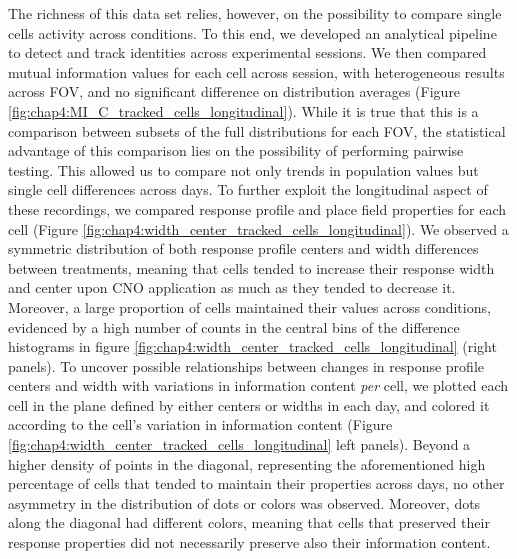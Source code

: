 The richness of this data set relies, however, on the possibility to compare single cells activity across conditions. 
To this end, we developed an analytical pipeline to detect and track identities across experimental sessions.  
We then compared mutual information values for each cell across session, with heterogeneous results across FOV, and no significant difference on distribution averages (Figure \ref{fig:chap4:MI_C_tracked_cells_longitudinal}). 
While it is true that this is a comparison between subsets of the full distributions for each FOV, the statistical advantage of this comparison lies on the possibility of performing pairwise testing. 
This allowed us to compare not only trends in population values but single cell differences across days. 
To further exploit the longitudinal aspect of these recordings, we compared response profile and place field properties for each cell (Figure \ref{fig:chap4:width_center_tracked_cells_longitudinal}).
We observed a symmetric distribution of both response profile centers and width differences between treatments, meaning that cells tended to increase their response width and center upon CNO application as much as they tended to decrease it. 
Moreover, a large proportion of cells maintained their values across conditions, evidenced by a high number of counts in the central bins of the difference histograms in figure \ref{fig:chap4:width_center_tracked_cells_longitudinal} (right panels). 
To uncover possible relationships between changes in response profile centers and width with variations in information content \textit{per} cell, we plotted each cell in the plane defined by either centers or widths in each day, and colored it according to the cell's variation in information content (Figure \ref{fig:chap4:width_center_tracked_cells_longitudinal} left panels). 
Beyond a higher density of points in the diagonal, representing the aforementioned high percentage of cells that tended to maintain their properties across days, no other asymmetry in the distribution of dots or colors was observed.
Moreover, dots along the diagonal had different colors, meaning that cells that preserved their response properties did not necessarily preserve also their information content. 

